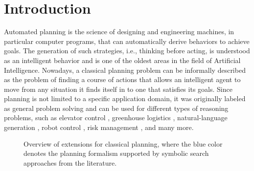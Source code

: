 \chapter{Introduction}

Automated planning is the science of designing and engineering machines, in particular computer programs, that can automatically derive behaviors to achieve goals.
The generation of such strategies, i.e., thinking before acting, is understood as an intelligent behavior and is one of the oldest areas in the field of Artificial Intelligence.
Nowadays, a classical planning problem can be informally described as the problem of finding a course of actions that allows an intelligent agent to move from any situation it finds itself in to one that satisfies its goals.
Since planning is not limited to a specific application domain, it was originally labeled as general problem solving \autocite{helmert-2008,newell-simon-cat1963} and can be used for different types of reasoning problems, such as elevator control \autocite{koehler-schuster-aips2000}, greenhouse logistics \autocite{helmert-lasinger-icaps2010}, natural-language generation \autocite{koller-hoffmann-icaps2010}, robot control \autocite{nilsson-tr1984,speck-et-al-ral2017,karpas-magazzeni-2020}, risk management \autocite{sohrabi-et-al-aaai2018,katz-et-al-icaps2021wsfinplan}, and many more.

\renewcommand{\kiviatTopk}{1}
\renewcommand{\kiviatGoal}{1}
\renewcommand{\kiviatCost}{1}
\renewcommand{\kiviatPredicates}{1}
\begin{figure}[t]
    \begin{center}
        
    \end{center}
    \caption[Overview of extension for classical planning.]{
        Overview of extensions for classical planning, where the blue color denotes the planning formalism supported by symbolic search approaches from the literature.
    }\label{fig:intro:kiviat}
\end{figure}
\renewcommand{\kiviatTopk}{1}
\renewcommand{\kiviatGoal}{1}
\renewcommand{\kiviatCost}{1}
\renewcommand{\kiviatPredicates}{1}

